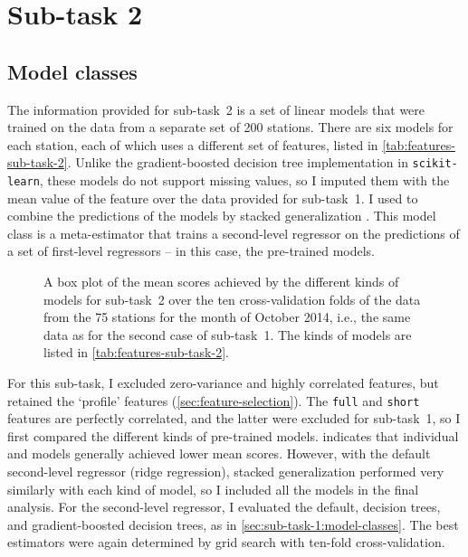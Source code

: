 \section{Sub-task 2}
\label{sec:sub-task-2}

\subsection{Model classes}
\label{sec:sub-task-2:model-classes}

The information provided for sub-task~2 is a set of linear models that were trained on
the data from a separate set of 200 stations.
There are six models for each station, each of which uses a different set of features,
listed in \cref{tab:features-sub-task-2}.
Unlike the gradient-boosted decision tree implementation in \texttt{scikit-learn},
these models do not support missing values, so I imputed them with the mean value of
the feature over the data provided for sub-task~1.
I used  to combine the predictions of the models
by stacked generalization \parencite{Wolpert1992}.
This model class is a meta-estimator that trains a second-level regressor on the
predictions of a set of first-level regressors -- in this case, the pre-trained models.

\begin{table}
  \centering
  
  \caption{The features used by the different kinds of pre-trained linear
    models for sub-task~2.
    The features are described in \cref{tab:features} and follow the same ordering.
  }
  \label{tab:features-sub-task-2}
\end{table}

\begin{figure}
  \centering
  
  \caption{A box plot of the mean scores achieved by the different kinds of models for
    sub-task~2 over the ten cross-validation folds of the data from the 75 stations for
    the month of October 2014, i.e., the same data as for the second case of sub-task~1.
    The kinds of models are listed in \cref{tab:features-sub-task-2}.
  }
  \label{fig:box-plot-sub-task-2}
\end{figure}

For this sub-task, I excluded zero-variance and highly correlated features, but
retained the `profile' features (\cref{sec:feature-selection}).
The \texttt{full} and \texttt{short} features are perfectly correlated, and the latter
were excluded for sub-task~1, so I first compared the different kinds of pre-trained
models.
 indicates that individual \rlmshort{} and \rlmshorttemp{} models
generally achieved lower mean scores.
However, with the default second-level regressor (ridge regression), stacked
generalization performed very similarly with each kind of model, so I included all the
models in the final analysis.
For the second-level regressor, I evaluated the default, decision trees, and
gradient-boosted decision trees, as in \cref{sec:sub-task-1:model-classes}.
The best estimators were again determined by grid search with ten-fold
cross-validation.

